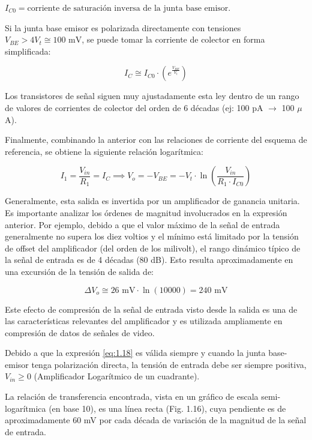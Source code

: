$I_{C0} = \text{corriente de saturación inversa de la junta base emisor.}$

Si la junta base emisor es polarizada directamente con tensiones $V_{BE} > 4V_t \cong 100 \text{ mV}$, se puede tomar la corriente de colector en forma simplificada:

\begin{equation}
    I_C \cong I_{C0} \cdot (e^{\frac{V_{BE}}{V_t}})
    \label{eq:1.18}
\end{equation}

Los transistores de señal siguen muy ajustadamente esta ley dentro de un rango de valores de corrientes de colector del orden de 6 décadas (ej: 100 pA $\to$ 100 $\mu$A).

Finalmente, combinando la anterior con las relaciones de corriente del esquema de referencia, se obtiene la siguiente relación logarítmica:

\begin{equation}
    I_1 = \frac{V_{in}}{R_1} = I_C \implies V_o = -V_{BE} = -V_t \cdot \ln \left( \frac{V_{in}}{R_1 \cdot I_{C0}} \right)
    \label{eq:1.19}
\end{equation}

Generalmente, esta salida es invertida por un amplificador de ganancia unitaria.
Es importante analizar los órdenes de magnitud involucrados en la expresión anterior. Por ejemplo, debido a que el valor máximo de la señal de entrada generalmente no supera los diez voltios y el mínimo está limitado por la tensión de offset del amplificador (del orden de los milivolt), el rango dinámico típico de la señal de entrada es de 4 décadas (80 dB). Esto resulta aproximadamente en una excursión de la tensión de salida de:

\[
\Delta V_o \cong 26 \text{ mV} \cdot \ln(10000) = 240 \text{ mV}
\]

Este efecto de compresión de la señal de entrada visto desde la salida es una de las características relevantes del amplificador y es utilizada ampliamente en compresión de datos de señales de video.

Debido a que la expresión \eqref{eq:1.18} es válida siempre y cuando la junta base-emisor tenga polarización directa, la tensión de entrada debe ser siempre positiva, $V_{in} \ge 0$ (Amplificador Logarítmico de un cuadrante).

La relación de transferencia encontrada, vista en un gráfico de escala semi-logarítmica (en base 10), es una línea recta (Fig. 1.16), cuya pendiente es de aproximadamente 60 mV por cada década de variación de la magnitud de la señal de entrada.

